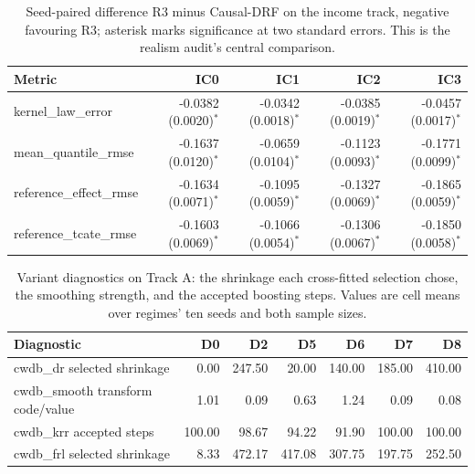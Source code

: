 \begin{table}[htbp]
\centering
\caption{Seed-paired difference R3 minus Causal-DRF on the income track, negative favouring R3; asterisk marks significance at two standard errors. This is the realism audit's central comparison.}
\label{tab:p6-income-paired}
\small
\begin{tabular}{@{}lrrrr@{}}
\toprule
Metric & IC0 & IC1 & IC2 & IC3 \\ 
\midrule
kernel\_law\_error & -0.0382 (0.0020)$^\ast$ & -0.0342 (0.0018)$^\ast$ & -0.0385 (0.0019)$^\ast$ & -0.0457 (0.0017)$^\ast$ \\ 
mean\_quantile\_rmse & -0.1637 (0.0120)$^\ast$ & -0.0659 (0.0104)$^\ast$ & -0.1123 (0.0093)$^\ast$ & -0.1771 (0.0099)$^\ast$ \\ 
reference\_effect\_rmse & -0.1634 (0.0071)$^\ast$ & -0.1095 (0.0059)$^\ast$ & -0.1327 (0.0069)$^\ast$ & -0.1865 (0.0059)$^\ast$ \\ 
reference\_tcate\_rmse & -0.1603 (0.0069)$^\ast$ & -0.1066 (0.0054)$^\ast$ & -0.1306 (0.0067)$^\ast$ & -0.1850 (0.0058)$^\ast$ \\ 
\bottomrule
\end{tabular}
\end{table}


\begin{table}[htbp]
\centering
\caption{Variant diagnostics on Track A: the shrinkage each cross-fitted selection chose, the smoothing strength, and the accepted boosting steps. Values are cell means over regimes' ten seeds and both sample sizes.}
\label{tab:p6-diag-track}
\small
\begin{tabular}{@{}lrrrrrr@{}}
\toprule
Diagnostic & D0 & D2 & D5 & D6 & D7 & D8 \\ 
\midrule
cwdb\_dr selected shrinkage & 0.00 & 247.50 & 20.00 & 140.00 & 185.00 & 410.00 \\ 
cwdb\_smooth transform code/value & 1.01 & 0.09 & 0.63 & 1.24 & 0.09 & 0.08 \\ 
cwdb\_krr accepted steps & 100.00 & 98.67 & 94.22 & 91.90 & 100.00 & 100.00 \\ 
cwdb\_frl selected shrinkage & 8.33 & 472.17 & 417.08 & 307.75 & 197.75 & 252.50 \\ 
\bottomrule
\end{tabular}
\end{table}


